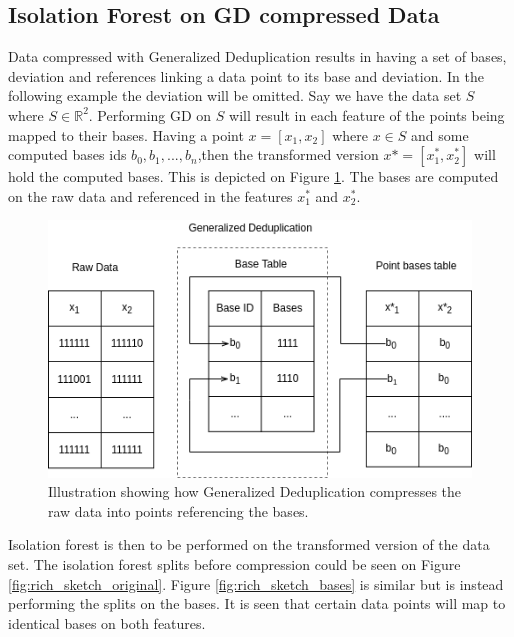 \subsection{Isolation Forest on GD compressed Data}
Data compressed with Generalized Deduplication results in having a set of bases, deviation and references linking a data point to its base and deviation. In the following example the deviation will be omitted. Say we have the data set $S$ where $S \in \mathbb{R}^2$. Performing GD on $S$ will result in each feature of the points being mapped to their bases. Having a point $x = [x_1,x_2]$ where $x \in S$ and some computed bases ids $b_0, b_1, ..., b_n$,then the transformed version $x*=[x^*_1, x^*_2]$ will hold the computed bases. This is depicted on Figure \ref*{fig:gd_points}. The bases are computed on the raw data and referenced in the features $x^*_1$ and $x^*_2$.

\begin{figure}
  \centering
  \includegraphics[width=\linewidth]{../files/test.png}
  \caption{Illustration showing how Generalized Deduplication compresses the raw data into points referencing the bases.}
  \label{fig:gd_points}
\end{figure}

Isolation forest is then to be performed on the transformed version of the data set. The isolation forest splits before compression could be seen on Figure \ref{fig:rich_sketch_original}. Figure \ref{fig:rich_sketch_bases} is similar but is instead performing the splits on the bases. It is seen that certain data points will map to identical bases on both features.

